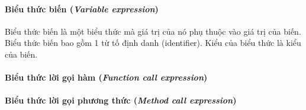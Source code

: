 \paragraph{Biểu thức biến (\textit{Variable expression})}

\regexvarexpr

Biểu thức biến là một biểu thức mà giá trị của nó phụ thuộc vào giá trị của biến. Biểu thức biến bao gồm 1 từ tố định danh (identifier). Kiểu của biểu thức là kiểu của biến.

\paragraph{Biểu thức lời gọi hàm (\textit{Function call expression})}

\paragraph{Biểu thức lời gọi phương thức (\textit{Method call expression})}
